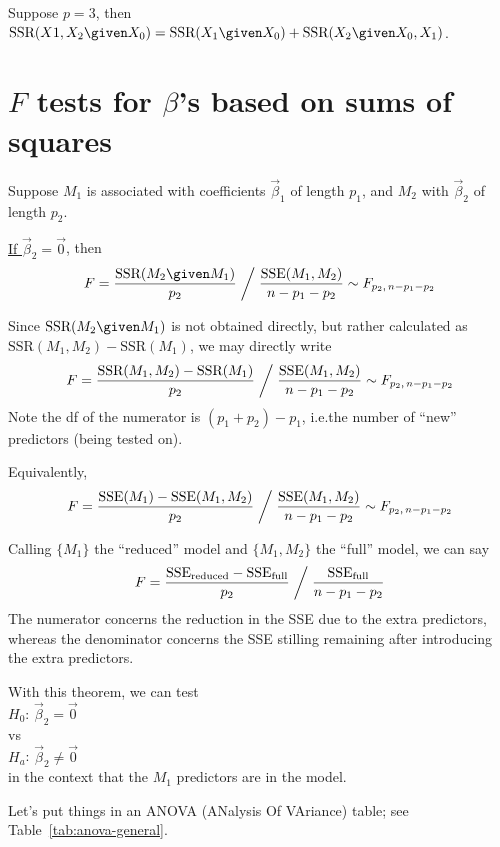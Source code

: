 \documentclass[12pt]{article}
\newcommand\SSR{\text{SSR}}
\begin{document}
\example
Suppose $p = 3$, then\\
$\SSR(X1, X_2 \given X_0)
= \SSR(X_1 \given X_0)
 + \SSR(X_2 \given X_0, X_1)
$.

\section{$F$ tests for $\beta$'s based on sums of squares}

Suppose $M_1$ is associated with coefficients $\vec{\beta}_1$
of length $p_1$, and $M_2$ with $\vec{\beta}_2$ of length $p_2$.

\theorem
\underline{If $\vec{\beta}_2 = \vec{0}$}, then
\[
F = \frac{\text{SSR}(M_2 \given M_1)}{p_2} \biggm/
    \frac{\text{SSE}(M_1, M_2)}{n - p_1 - p_2}
\sim F_{p_2,\, n - p_1 - p_2}
\]

Since $\text{SSR}(M_2 \given M_1)$ is not obtained directly,
but rather calculated as $\text{SSR}(M_1, M_2) - \text{SSR}(M_1)$,
we may directly write
\[
F = \frac{\text{SSR}(M_1, M_2) - \text{SSR}(M_1)}{p_2}
    \biggm/
    \frac{\text{SSE}(M_1, M_2)}{n - p_1 - p_2}
\sim F_{p_2,\, n - p_1 - p_2}
\]
Note the df of the numerator is $(p_1 + p_2) - p_1$, i.e.\@ the
number of ``new'' predictors (being tested on).

Equivalently,
\[
F = \frac{\text{SSE}(M_1) - \text{SSE}(M_1, M_2)}{p_2}
    \biggm/
    \frac{\text{SSE}(M_1, M_2)}{n - p_1 - p_2}
\sim F_{p_2,\, n - p_1 - p_2}
\]

Calling $\{M_1\}$ the ``reduced'' model and $\{M_1, M_2\}$ the ``full''
model, we can say
\[
F = \frac{\text{SSE}_{\text{reduced}} - \text{SSE}_{\text{full}}}{p_2}
    \biggm/
    \frac{\text{SSE}_{\text{full}}}{n - p_1 - p_2}
\]
The numerator concerns the reduction in the SSE due to the extra
predictors, whereas the denominator concerns the SSE stilling remaining
after introducing the extra predictors.

With this theorem, we can test
\\
$H_0$: $\vec{\beta}_2 = \vec{0}$\\ vs\\
$H_a$: $\vec{\beta}_2 \ne \vec{0}$
\\
in the context that the $M_1$ predictors are in the model.

Let's put things in an ANOVA (ANalysis Of VAriance) table;
see Table~\ref{tab:anova-general}.
\end{document}
